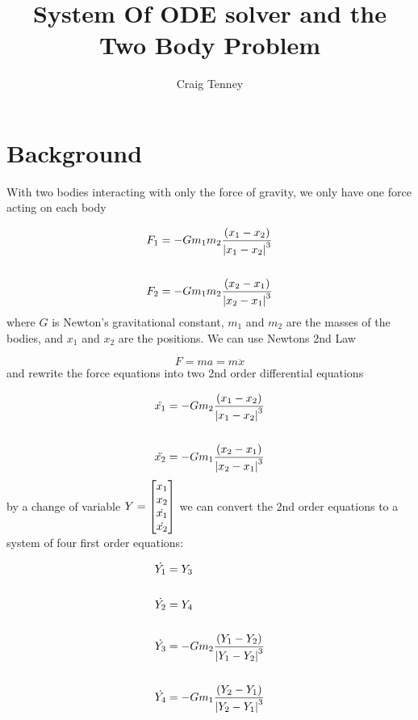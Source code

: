 \documentclass[12pt]{article}
\title{System Of ODE solver and the Two Body Problem}
\author{Craig Tenney}
\begin{document}
\maketitle

\section{Background}

With two bodies interacting with only the force of gravity, we only have one force acting on each body

\begin{equation}
\begin{aligned}
&F_1 = -Gm_1m_2 \frac{(x_1-x_2)}{\abs{x_1-x_2}^3}\\
\\
&F_2 = -Gm_1m_2 \frac{(x_2-x_1)}{\abs{x_2-x_1}^3}
\end{aligned}
\end{equation} 
%
where $G$ is Newton's gravitational constant, $m_1$ and $m_2$ are the masses of the bodies, and $x_1$ and $x_2$ are the positions. We can use Newtons 2nd Law

\begin{equation}
F = ma = m \ddot{x}
\end{equation}
%
and rewrite the force equations into two 2nd order differential equations 
 
\begin{equation}
\begin{aligned}
    &\ddot{x_1} = -Gm_2 \frac{(x_1-x_2)}{\abs{x_1-x_2}^3}\\
    \\
    &\ddot{x_2} = -Gm_1 \frac{(x_2-x_1)}{\abs{x_2-x_1}^3}
\end{aligned}
\end{equation}
%
by a change of variable $Y = \mqty[x_1  \\ x_2 \\ \dot{x_1} \\ \dot{x_2}]$ we can convert the 2nd order equations to a system of four first order equations:

\begin{equation}
\begin{aligned}
&\dot{Y_1} = Y_3\\
\\
&\dot{Y_2} = Y_4\\
\\
&\dot{Y_3} = -Gm_2 \frac{(Y_1-Y_2)}{\abs{Y_1-Y_2}^3}\\
\\
&\dot{Y_4} = -Gm_1 \frac{(Y_2-Y_1)}{\abs{Y_2-Y_1}^3}\\
\end{aligned}
\end{equation}
\end{document}
